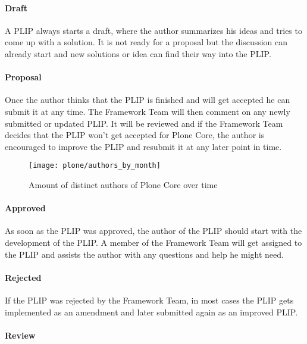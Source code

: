 \paragraph{Draft}

A \ac{PLIP} always starts a draft, where the author summarizes his ideas and
tries to come up with a solution. It is not ready for a proposal but the
discussion can already start and new solutions or idea can find their way into
the \ac{PLIP}.

\paragraph{Proposal}

Once the author thinks that the \ac{PLIP} is finished and will get accepted he
can submit it at any time. The Framework Team will then comment on any newly
submitted or updated \ac{PLIP}. It will be reviewed and if the Framework Team
decides that the \ac{PLIP} won't get accepted for Plone Core, the author is
encouraged to improve the \ac{PLIP} and resubmit it at any later point in time.

\begin{figure}[hbtp]
  \centering
  \texttt{[image: plone/authors\_by\_month]}
  \caption{Amount of distinct authors of Plone Core over time}
\end{figure}

\paragraph{Approved}

As soon as the \ac{PLIP} was approved, the author of the \ac{PLIP} should start
with the development of the \ac{PLIP}. A member of the Framework Team will get
assigned to the \ac{PLIP} and assists the author with any questions and help he
might need.

\paragraph{Rejected}

If the \ac{PLIP} was rejected by the Framework Team, in most cases the
\ac{PLIP} gets implemented as an amendment and later submitted again as an
improved \ac{PLIP}.

\paragraph{Review}

